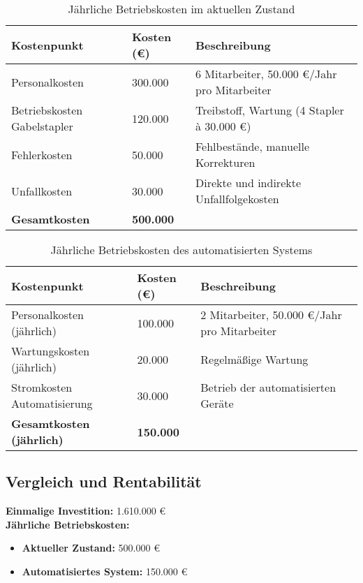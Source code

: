 \begin{table}[h!]
	\centering
	\begin{tabular}{|p{8cm}|p{4cm}|p{5cm}|}
		\hline
		\textbf{Kostenpunkt} & \textbf{Kosten (€)} & \textbf{Beschreibung} \\
		\hline
		Personalkosten  & 300.000 & 6 Mitarbeiter, 50.000 €/Jahr pro Mitarbeiter \\
		\hline
		Betriebskosten Gabelstapler & 120.000 & Treibstoff, Wartung (4 Stapler à 30.000 €) \\
		\hline
		Fehlerkosten & 50.000 & Fehlbestände, manuelle Korrekturen \\
		\hline
		Unfallkosten & 30.000 & Direkte und indirekte Unfallfolgekosten \\
		\hline
		\textbf{Gesamtkosten} & \textbf{500.000} & \\
		\hline
	\end{tabular}
	\caption{Jährliche Betriebskosten im aktuellen Zustand}
\end{table}


\begin{table}[h!]
	\centering
	\begin{tabular}{|p{8cm}|p{4cm}|p{5cm}|}
		\hline
		\textbf{Kostenpunkt} & \textbf{Kosten (€)} & \textbf{Beschreibung} \\
		\hline
		Personalkosten (jährlich) & 100.000 & 2 Mitarbeiter, 50.000 €/Jahr pro Mitarbeiter \\
		\hline
		Wartungskosten (jährlich) & 20.000 & Regelmäßige Wartung \\
		\hline
		Stromkosten Automatisierung & 30.000 & Betrieb der automatisierten Geräte \\
		\hline
		\textbf{Gesamtkosten (jährlich)} & \textbf{150.000} & \\
		\hline
	\end{tabular}
	\caption{Jährliche Betriebskosten des automatisierten Systems}
\end{table}

\subsection*{Vergleich und Rentabilität}
\textbf{Einmalige Investition:} 1.610.000 € \\

\textbf{Jährliche Betriebskosten:}
\begin{itemize}
	\item \textbf{Aktueller Zustand:} 500.000 €
	\item \textbf{Automatisiertes System:} 150.000 €
\end{itemize}

